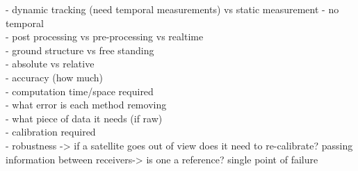 - dynamic tracking (need temporal measurements) vs static measurement - no temporal\\
- post processing vs pre-processing vs realtime\\
- ground structure vs free standing\\
- absolute vs relative\\
- accuracy (how much)\\
- computation time/space required\\
- what error is each method removing\\
- what piece of data it needs (if raw)\\
- calibration required\\
- robustness -> if a satellite goes out of view does it need to re-calibrate? passing information between receivers-> is one a reference? single point of failure



